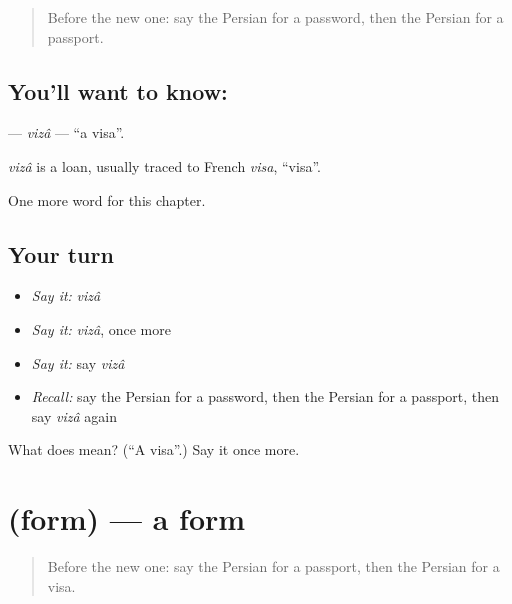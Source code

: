 \label{lesson:FA-C168-viza}



\begin{quote}
Before the new one: say the Persian for a password, then the Persian for a passport.
\end{quote}

\subsection*{You'll want to know: }
\textbf{} — \emph{vizâ} — \textquotedblleft{}a visa\textquotedblright{}.

\begin{cousinweb}
\emph{vizâ} is a loan, usually traced to French \emph{visa}, \textquotedblleft{}visa\textquotedblright{}.
\end{cousinweb}

\begin{grammarlens}[title={What you've built}]
One more word for this chapter.
\end{grammarlens}

\subsection*{Your turn}
\begin{itemize}
\raggedright
  \item \emph{Say it:} \emph{vizâ}
  \item \emph{Say it:} \emph{vizâ}, once more
  \item \emph{Say it:} say \emph{vizâ}
  \item \emph{Recall:} say the Persian for a password, then the Persian for a passport, then say \emph{vizâ} again
\end{itemize}

\begin{tcolorbox}[breakable,colback=teal!4,colframe=teal!35!black,title={Before you move on}]
What does  mean? (\textquotedblleft{}A visa\textquotedblright{}.) Say it once more.
\end{tcolorbox}
\section[\texorpdfstring{\fa{فرم} (form)}{فرم (form)}]{ (form) — a form}

\label{lesson:FA-C168-form}



\begin{quote}
Before the new one: say the Persian for a passport, then the Persian for a visa.
\end{quote}

